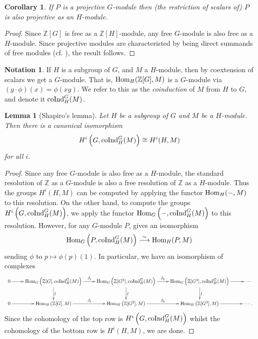 \documentclass[11pt]{amsart}
\numberwithin{equation}{section}
\newtheorem{lemma}[equation]{Lemma}
\newtheorem{cor}[equation]{Corollary}
\theoremstyle{remark}
\theoremstyle{remark}
\theoremstyle{remark}
\theoremstyle{definition}
\theoremstyle{definition}
\theoremstyle{definition}
\theoremstyle{definition}
\newtheorem{notation}[equation]{Notation}
\theoremstyle{definition}
\theoremstyle{definition}
\begin{document}
\begin{cor}
If $P$ is a projective $G$-module then  (the restriction of scalars of) $P$ is also projective as an $H$-module.
\end{cor}

\begin{proof}
Since $\mathbb{Z}[G]$ is free as a $\mathbb{Z}[H]$-module, any free $G$-module is also free as a $H$-module. Since projective modules are characteristed by being direct summands of free modules (cf. ), the result follows.  
\end{proof}

\begin{notation}
If $H$ is a subgroup of $G$, and $M$ a $H$-module, then by coextension of scalars we get a $G$-module. That is, 
$\textup{Hom}_{H}(\mathbb{Z}[G],M)$
is a $G$-module via $(g\cdot \phi)(x)=\phi(xg)$. We refer to this as the \textit{coinduction} of $M$ from $H$ to $G$, and denote it $\textup{coInd}_{H}^G(M)$.
\end{notation}

\begin{lemma}[Shapiro's lemma]
Let $H$ be a subgroup of $G$ and $M$ be a $H$-module. Then there is a canonical isomorphism 
\[H^i\left(G,\textup{coInd}_{H}^G(M)\right)\cong H^i(H,M)\]
for all $i$.
\end{lemma}

\begin{proof}
Since any free $G$-module is also free as a $H$-module, the standard resolution of $\mathbb{Z}$ as a $G$-module is also a free resolution of $\mathbb{Z}$ as a $H$-module. Thus the groups $H^i(H,M)$ can be computed by applying the functor $\textup{Hom}_H(-,M)$ to this resolution. On the other hand, to compute the groups  $H^i\left(G,\textup{coInd}_{H}^G(M)\right)$, we apply the functor $\textup{Hom}_G\left(-,\textup{coInd}_{H}^G(M)\right)$ to this resolution. However, for any $G$-module $P$,  gives an isomorphism 
\[\textup{Hom}_G\left(P,\textup{coInd}_{H}^G(M)\right)\stackrel{\sim}{\longrightarrow}\textup{Hom}_H(P,M) \]
sending $\phi $ to $p\mapsto \phi(p)(1)$. In particular, we have an isomorphism of complexes
\[\scalebox{0.9}{
\xymatrix{0\ar[r]&\textup{Hom}_{G}\left(\mathbb{Z}[G],\textup{coInd}_{H}^G(M)\right)\ar[r]^{\tilde{\partial}_1}\ar[d]^*[@]{\sim}&\textup{Hom}_{G}\left(\mathbb{Z}[G^2],\textup{coInd}_{H}^G(M)\right)\ar[r]^{\tilde{\partial}_2}\ar[d]^*[@]{\sim}& \textup{Hom}_{G}\left(\mathbb{Z}[G^3],\textup{coInd}_{H}^G(M)\right)\ar[r]\ar[d]^*[@]{\sim}&\cdots \\ 0\ar[r]&\textup{Hom}_{H}\left(\mathbb{Z}[G],M\right)\ar[r]^{\tilde{\partial}_1}&
\textup{Hom}_{H}\left(\mathbb{Z}[G^2],M\right)\ar[r]^{\tilde{\partial}_2} &\textup{Hom}_{H}\left(\mathbb{Z}[G^3],M\right)\ar[r]&\cdots.}}
\] 
Since the cohomology of the top row is $H^i\left(G,\textup{coInd}_{H}^G(M)\right)$ whilst the cohomology of the bottom row is $H^i(H,M)$, we are done. 
\end{proof}
\end{document}
